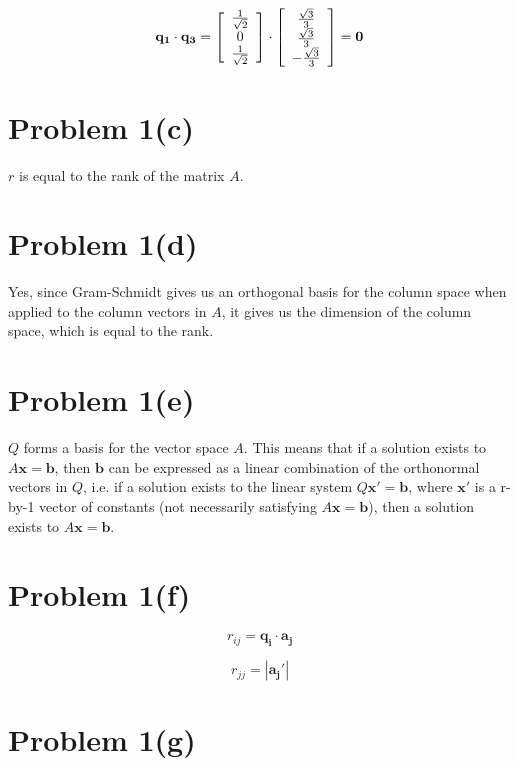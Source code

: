 \documentclass{article}
\begin{document}
$$
\mathbf{q_1} \cdot \mathbf{q_3} = 
\left[ \begin{array} {*{3}c} 
    \frac{1}{\sqrt{2}} \\
    0 \\
    \frac{1}{\sqrt{2}} \\
\end{array}\right] 
\cdot 
\left[ \begin{array} {*{3}c} 
    \frac{\sqrt{3}}{3} \\
    \frac{\sqrt{3}}{3} \\
    - \frac{\sqrt{3}}{3} \\
\end{array}\right]
= \mathbf{0}
$$

\section*{Problem 1(c)}

$r$ is equal to the rank of the matrix $A$.

\section*{Problem 1(d)}

Yes, since Gram-Schmidt gives us an orthogonal basis for the column space when applied to the column vectors in $A$, it gives us the dimension of the column space, which is equal to the rank.

\section*{Problem 1(e)}

$Q$ forms a basis for the vector space $A$. This means that if a solution exists to $A\mathbf{x}=\mathbf{b}$, then $\mathbf{b}$ can be expressed as a linear combination of the orthonormal vectors in $Q$, i.e. if a solution exists to the linear system $Q\mathbf{x'}=\mathbf{b}$, where $\mathbf{x'}$ is a r-by-1 vector of constants (not necessarily satisfying $A\mathbf{x}=\mathbf{b}$), then a solution exists to $A\mathbf{x}=\mathbf{b}$.

\section*{Problem 1(f)}


$$ r_{ij} = \mathbf{q_i} \cdot \mathbf{a_j} $$

$$ r_{jj} = |\mathbf{a_j'}|$$

\section*{Problem 1(g)}
\end{document}
